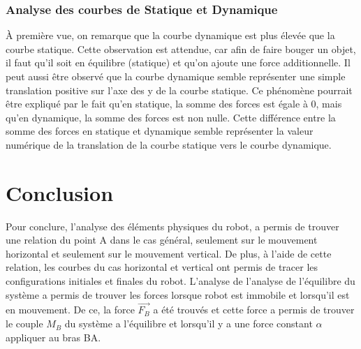 \documentclass{article}
\begin{document}
\subsubsection{Analyse des courbes de Statique et Dynamique}
\noindent
À première vue, on remarque que la courbe dynamique est plus élevée que la courbe statique. Cette observation est attendue, car afin de faire bouger un objet, il faut qu'il soit en équilibre (statique) et qu'on ajoute une force additionnelle. Il peut aussi être observé que la courbe dynamique semble représenter une simple translation positive sur l'axe des y de la courbe statique. Ce phénomène pourrait être expliqué par le fait qu'en statique, la somme des forces est égale à 0, mais qu'en dynamique, la somme des forces est non nulle. Cette différence entre la somme des forces en statique et dynamique semble représenter la valeur numérique de la translation de la courbe statique vers le courbe dynamique.

\section{Conclusion}
\noindent
Pour conclure, l'analyse des éléments physiques du robot, a permis de trouver une relation du point A dans le cas général, seulement sur le mouvement horizontal et seulement sur le mouvement vertical. De plus, à l'aide de cette relation, les courbes du cas horizontal et vertical ont permis de tracer les configurations initiales et finales du robot. L'analyse de l'analyse de l'équilibre du système a permis de trouver les forces lorsque robot est immobile et lorsqu'il est en mouvement. De ce, la force $\overrightarrow{F_B}$ a été trouvés et cette force a permis de trouver le couple $M_B$ du système a l'équilibre et lorsqu'il y a une force constant $\alpha$ appliquer au bras BA.
\end{document}
